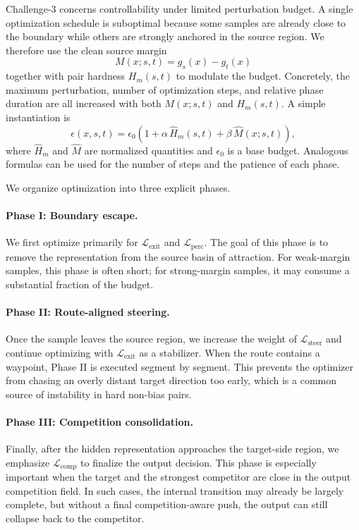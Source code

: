 Challenge-3 concerns controllability under limited perturbation budget. A single optimization schedule is suboptimal because some samples are already close to the boundary while others are strongly anchored in the source region. We therefore use the clean source margin
\begin{equation}
M(x;s,t)=g_s(x)-g_t(x)
\end{equation}
together with pair hardness $H_m(s,t)$ to modulate the budget. Concretely, the maximum perturbation, number of optimization steps, and relative phase duration are all increased with both $M(x;s,t)$ and $H_m(s,t)$. A simple instantiation is
\begin{equation}
\epsilon(x,s,t)
=
\epsilon_0
\left(
1+\alpha \,\widehat{H}_m(s,t)+\beta \,\widehat{M}(x;s,t)
\right),
\label{eq:tempo-budget}
\end{equation}
where $\widehat{H}_m$ and $\widehat{M}$ are normalized quantities and $\epsilon_0$ is a base budget. Analogous formulas can be used for the number of steps and the patience of each phase.

We organize optimization into three explicit phases.

\paragraph{Phase I: Boundary escape.}
We first optimize primarily for $\mathcal{L}_{\mathrm{exit}}$ and $\mathcal{L}_{\mathrm{perc}}$. The goal of this phase is to remove the representation from the source basin of attraction. For weak-margin samples, this phase is often short; for strong-margin samples, it may consume a substantial fraction of the budget.

\paragraph{Phase II: Route-aligned steering.}
Once the sample leaves the source region, we increase the weight of $\mathcal{L}_{\mathrm{steer}}$ and continue optimizing with $\mathcal{L}_{\mathrm{exit}}$ as a stabilizer. When the route contains a waypoint, Phase II is executed segment by segment. This prevents the optimizer from chasing an overly distant target direction too early, which is a common source of instability in hard non-bias pairs.

\paragraph{Phase III: Competition consolidation.}
Finally, after the hidden representation approaches the target-side region, we emphasize $\mathcal{L}_{\mathrm{comp}}$ to finalize the output decision. This phase is especially important when the target and the strongest competitor are close in the output competition field. In such cases, the internal transition may already be largely complete, but without a final competition-aware push, the output can still collapse back to the competitor.

